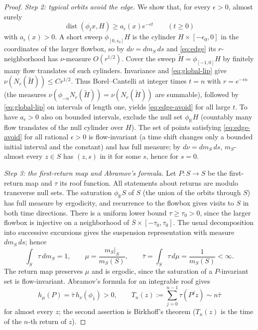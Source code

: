 \documentclass[11pt]{article}
\theoremstyle{remark}
\newcommand{\R}{\mathbb R}
\newcommand{\dist}{\operatorname{dist}}
\begin{document}
\begin{proof}
\emph{Step 2: typical orbits avoid the edge.}
We show that, for every \(\epsilon>0\), almost surely
\begin{equation}\label{eq:edge-avoid}
 \dist(\phi_t x,H)\ge a_\epsilon(x)e^{-\epsilon t}
                     \qquad(t\ge0)
\end{equation}
with \(a_\epsilon(x)>0\).
A short sweep \(\phi_{[0,\epsilon_0]}H\) is the cylinder
\(H\times[-\epsilon_0,0]\) in the coordinates of the larger flowbox,
so by \(d\nu=dm_S\,ds\) and \eqref{eq:edge} its \(r\)-neighborhood has
\(\nu\)-measure \(O(r^{1/2})\).
Cover the sweep \(\widetilde H=\phi_{[-1,0]}H\) by finitely many flow
translates of such cylinders.  Invariance and \eqref{eq:global-lip}
give \(\nu(N_r(\widetilde H))\le C r^{1/2}\).
Thus Borel--Cantelli at integer times \(t=n\) with \(r=e^{-\epsilon n}\)
(the measures \(\nu(\phi_{-n}N_r(\widetilde H))=\nu(N_r(\widetilde H))\)
are summable), followed by \eqref{eq:global-lip} on intervals of
length one, yields \eqref{eq:edge-avoid} for all large \(t\).
To have \(a_\epsilon>0\) also on bounded intervals, exclude the null
set \(\phi_{\R}H\) (countably many flow translates of the null
cylinder over \(H\)).
The set of points satisfying \eqref{eq:edge-avoid} for all rational
\(\epsilon>0\) is flow-invariant (a time shift changes only a bounded
initial interval and the constant) and has full measure; by
\(d\nu=dm_S\,ds\), \(m_S\)-almost every \(z\in S\) has \((z,s)\) in
it for some \(s\), hence for \(s=0\).

\emph{Step 3: the first-return map and Abramov's formula.}
Let \(P:S\to S\) be the first-return map and \(\tau\) its roof function.
All statements about returns are modulo transverse null sets.
The saturation \(\phi_\R S\) of \(S\) (the union of the orbits through
\(S\)) has full measure by ergodicity, and recurrence to the flowbox
gives visits to \(S\) in both time directions.
There is a uniform lower bound \(\tau\ge\tau_0>0\), since the larger
flowbox is injective on a neighborhood of
\(\overline S\times[-\tau_0,\tau_0]\).
The usual decomposition into successive excursions gives the
suspension representation with measure \(dm_S\,ds\); hence
\[
 \int_S\tau\,dm_S=1,\qquad
 \mu=\frac{m_S|_S}{m_S(S)},\qquad
 \bar\tau=\int_S\tau\,d\mu=\frac1{m_S(S)}<\infty.
\]
The return map preserves \(\mu\) and is ergodic, since the saturation
of a \(P\)-invariant set is flow-invariant.
Abramov's formula for an integrable roof \cite{Abramov1959} gives
\begin{equation}\label{eq:abramov}
 h_\mu(P)=\bar\tau\,h_\nu(\phi_1)>0,\qquad
 T_n(z):=\sum_{j=0}^{n-1}\tau(P^jz)\sim n\bar\tau
\end{equation}
for almost every \(z\); the second assertion is Birkhoff's theorem
(\(T_n(z)\) is the time of the \(n\)-th return of \(z\)).


\end{proof}
\end{document}
